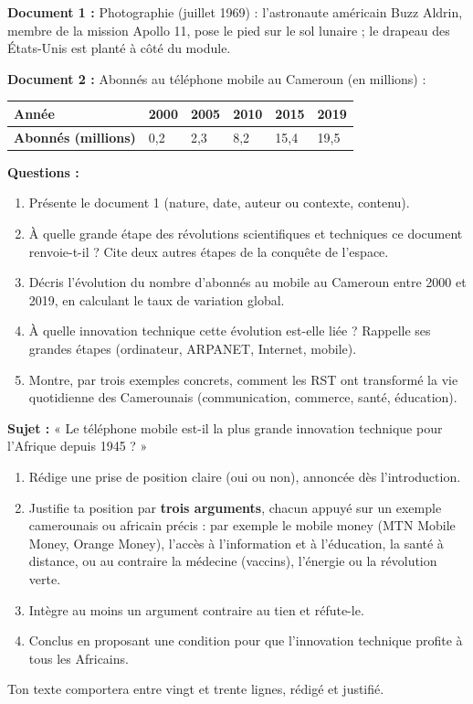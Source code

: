 \documentclass[11pt]{article}
\begin{document}
\begin{exercice}
\textbf{Document 1 :} Photographie (juillet 1969) : l'astronaute américain Buzz Aldrin, membre de la mission Apollo 11, pose le pied sur le sol lunaire ; le drapeau des États-Unis est planté à côté du module.

\textbf{Document 2 :} Abonnés au téléphone mobile au Cameroun (en millions) :

\begin{center}
\begin{tabularx}{\linewidth}{|l|X|X|X|X|X|}
\hline
\rowcolor{popblueL} \textbf{Année} & 2000 & 2005 & 2010 & 2015 & 2019 \\
\hline
\textbf{Abonnés (millions)} & 0,2 & 2,3 & 8,2 & 15,4 & 19,5 \\
\hline
\end{tabularx}
\end{center}

\textbf{Questions :}
\begin{enumerate}
\item Présente le document 1 (nature, date, auteur ou contexte, contenu).
\item À quelle grande étape des révolutions scientifiques et techniques ce document renvoie-t-il ? Cite deux autres étapes de la conquête de l'espace.
\item Décris l'évolution du nombre d'abonnés au mobile au Cameroun entre 2000 et 2019, en calculant le taux de variation global.
\item À quelle innovation technique cette évolution est-elle liée ? Rappelle ses grandes étapes (ordinateur, ARPANET, Internet, mobile).
\item Montre, par trois exemples concrets, comment les RST ont transformé la vie quotidienne des Camerounais (communication, commerce, santé, éducation).
\end{enumerate}
\end{exercice}

\begin{exercice}
\textbf{Sujet :} « Le téléphone mobile est-il la plus grande innovation technique pour l'Afrique depuis 1945 ? »

\begin{enumerate}
\item Rédige une prise de position claire (oui ou non), annoncée dès l'introduction.
\item Justifie ta position par \textbf{trois arguments}, chacun appuyé sur un exemple camerounais ou africain précis : par exemple le mobile money (MTN Mobile Money, Orange Money), l'accès à l'information et à l'éducation, la santé à distance, ou au contraire la médecine (vaccins), l'énergie ou la révolution verte.
\item Intègre au moins un argument contraire au tien et réfute-le.
\item Conclus en proposant une condition pour que l'innovation technique profite à tous les Africains.
\end{enumerate}
Ton texte comportera entre vingt et trente lignes, rédigé et justifié.
\end{exercice}
\end{document}
